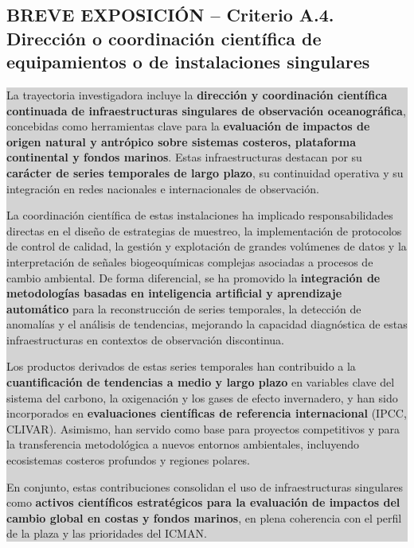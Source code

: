 \documentclass[11pt,a4paper]{article}
\newcommand{\breveexposicion}[2]{
    \subsection*{\color{darkgray}\textbf{BREVE EXPOSICIÓN -- #1}}
    \vspace{0.3em}
    \noindent\colorbox{lightgray}{%
        \begin{minipage}{0.97\textwidth}
        \vspace{0.5em}
        \color{darkgray}
        #2
        \vspace{0.5em}
        \end{minipage}
    }
    \vspace{1em}
}
\begin{document}
\breveexposicion{Criterio A.4. Dirección o coordinación científica de equipamientos o de instalaciones singulares}{
La trayectoria investigadora incluye la \textbf{dirección y coordinación científica continuada de infraestructuras singulares de observación oceanográfica}, concebidas como herramientas clave para la \textbf{evaluación de impactos de origen natural y antrópico sobre sistemas costeros, plataforma continental y fondos marinos}. Estas infraestructuras destacan por su \textbf{carácter de series temporales de largo plazo}, su continuidad operativa y su integración en redes nacionales e internacionales de observación.

La coordinación científica de estas instalaciones ha implicado responsabilidades directas en el diseño de estrategias de muestreo, la implementación de protocolos de control de calidad, la gestión y explotación de grandes volúmenes de datos y la interpretación de señales biogeoquímicas complejas asociadas a procesos de cambio ambiental. De forma diferencial, se ha promovido la \textbf{integración de metodologías basadas en inteligencia artificial y aprendizaje automático} para la reconstrucción de series temporales, la detección de anomalías y el análisis de tendencias, mejorando la capacidad diagnóstica de estas infraestructuras en contextos de observación discontinua.

Los productos derivados de estas series temporales han contribuido a la \textbf{cuantificación de tendencias a medio y largo plazo} en variables clave del sistema del carbono, la oxigenación y los gases de efecto invernadero, y han sido incorporados en \textbf{evaluaciones científicas de referencia internacional} (IPCC, CLIVAR). Asimismo, han servido como base para proyectos competitivos y para la transferencia metodológica a nuevos entornos ambientales, incluyendo ecosistemas costeros profundos y regiones polares.

En conjunto, estas contribuciones consolidan el uso de infraestructuras singulares como \textbf{activos científicos estratégicos para la evaluación de impactos del cambio global en costas y fondos marinos}, en plena coherencia con el perfil de la plaza y las prioridades del ICMAN.
}
\end{document}
